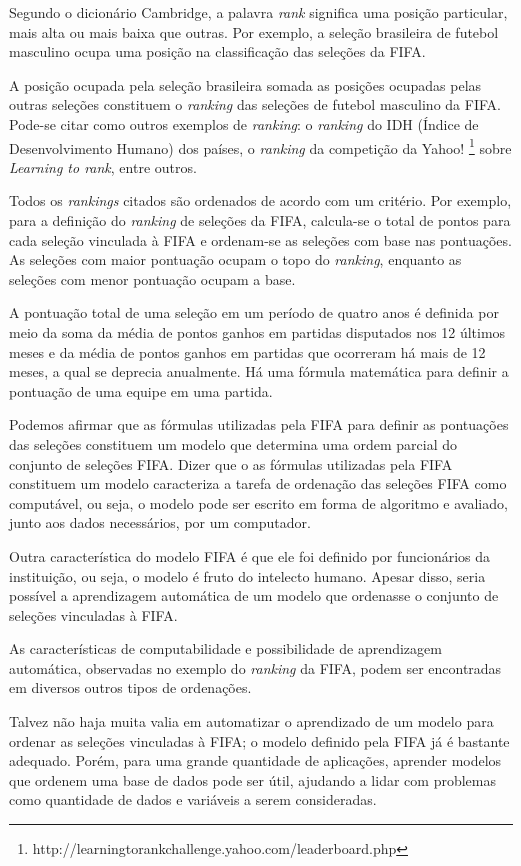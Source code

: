 Segundo o dicionário Cambridge, a palavra \emph{rank} significa uma posição particular, mais alta ou mais baixa que outras. Por exemplo, a seleção brasileira de futebol masculino ocupa uma posição na classificação das seleções da FIFA.

A posição ocupada pela seleção brasileira somada as posições ocupadas pelas outras seleções constituem o \emph{ranking} das seleções de futebol masculino da FIFA. Pode-se citar como outros exemplos de \emph{ranking}: o \emph{ranking} do IDH (Índice de Desenvolvimento Humano) dos países, o \emph{ranking} da competição da Yahoo! \footnote{http://learningtorankchallenge.yahoo.com/leaderboard.php} sobre \emph{Learning to rank}, entre outros.

Todos os \emph{rankings} citados são ordenados de acordo com um critério. Por exemplo, para a definição do \emph{ranking} de seleções da FIFA, calcula-se o total de pontos para cada seleção vinculada à FIFA e ordenam-se as seleções com base nas pontuações. As seleções com maior pontuação ocupam o topo do \emph{ranking}, enquanto as seleções com menor pontuação ocupam a base.

A pontuação total de uma seleção em um período de quatro anos é definida por meio da soma da média de pontos ganhos em partidas disputados nos 12 últimos meses e da média de pontos ganhos em partidas que ocorreram há mais de 12 meses, a qual se deprecia anualmente. Há uma fórmula matemática para definir a pontuação de uma equipe em uma partida.

Podemos afirmar que as fórmulas utilizadas pela FIFA para definir as pontuações das seleções constituem um modelo que determina uma ordem parcial do conjunto de seleções FIFA. Dizer que o as fórmulas utilizadas pela FIFA constituem um modelo caracteriza a tarefa de ordenação das seleções FIFA como computável, ou seja, o modelo pode ser escrito em forma de algoritmo e avaliado, junto aos dados necessários, por um computador.

Outra característica do modelo FIFA é que ele foi definido por funcionários da instituição, ou seja, o modelo é fruto do intelecto humano. Apesar disso, seria possível a aprendizagem automática de um modelo que ordenasse o conjunto de seleções vinculadas à FIFA.

As características de computabilidade e possibilidade de aprendizagem automática, observadas no exemplo do \emph{ranking} da FIFA, podem ser encontradas em diversos outros tipos de ordenações.

Talvez não haja muita valia em automatizar o aprendizado de um modelo para ordenar as seleções vinculadas à FIFA; o modelo definido pela FIFA já é bastante adequado. Porém, para uma grande quantidade de aplicações, aprender modelos que ordenem uma base de dados pode ser útil, ajudando a lidar com problemas como quantidade de dados e variáveis a serem consideradas.

